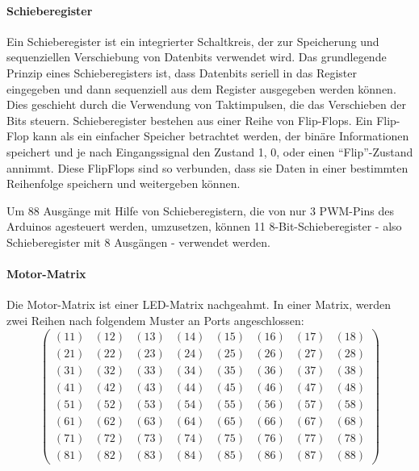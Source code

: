 
\paragraph{Schieberegister}
Ein Schieberegister ist ein integrierter Schaltkreis, der zur Speicherung und sequenziellen Verschiebung von
Datenbits verwendet wird.\newline
Das grundlegende Prinzip eines Schieberegisters ist, dass Datenbits seriell in das Register eingegeben und dann sequenziell aus dem Register ausgegeben werden können.
Dies geschieht durch die Verwendung von Taktimpulsen, die das Verschieben der Bits steuern.\newline
Schieberegister bestehen aus einer Reihe von Flip-Flops.
Ein Flip-Flop kann als ein einfacher Speicher betrachtet werden, der binäre Informationen speichert und je nach Eingangssignal den Zustand 1, 0, oder einen \enquote{Flip}-Zustand annimmt.
Diese FlipFlops sind so verbunden, dass sie Daten in einer bestimmten Reihenfolge speichern und weitergeben können.

Um 88 Ausgänge mit Hilfe von Schieberegistern, die von nur 3 \ac{PWM}-Pins des Arduinos agesteuert werden, umzusetzen, können 11 8-Bit-Schieberegister  - also Schieberegister mit 8 Ausgängen - verwendet werden.

\paragraph{Motor-Matrix}
Die Motor-Matrix ist einer LED-Matrix nachgeahmt.
In einer Matrix, werden zwei Reihen nach folgendem Muster an Ports angeschlossen:
$$
\begin{pmatrix}
	(11) & (12) & (13) & (14) & (15) & (16) & (17) & (18) \\
	(21) & (22) & (23) & (24) & (25) & (26) & (27) & (28) \\
	(31) & (32) & (33) & (34) & (35) & (36) & (37) & (38) \\
	(41) & (42) & (43) & (44) & (45) & (46) & (47) & (48) \\
	(51) & (52) & (53) & (54) & (55) & (56) & (57) & (58) \\
	(61) & (62) & (63) & (64) & (65) & (66) & (67) & (68) \\
	(71) & (72) & (73) & (74) & (75) & (76) & (77) & (78) \\
	(81) & (82) & (83) & (84) & (85) & (86) & (87) & (88)
\end{pmatrix}
$$


